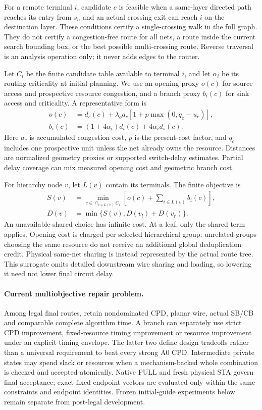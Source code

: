 \documentclass[conference,10pt]{IEEEtran}
\begin{document}
For a remote terminal $i$, candidate $c$ is feasible when a same-layer directed path reaches its entry from $s_n$ and an actual crossing exit can reach $i$ on the destination layer. These conditions certify a single-crossing walk in the full graph. They do not certify a congestion-free route for all nets, a route inside the current search bounding box, or the best possible multi-crossing route. Reverse traversal is an analysis operation only; it never adds edges to the router.

Let $C_i$ be the finite candidate table available to terminal $i$, and let $\alpha_i$ be its routing criticality at initial planning. We use an opening proxy $o(c)$ for source access and prospective resource congestion, and a branch proxy $b_i(c)$ for sink access and criticality. A representative form is
\begin{align}
 o(c)&=d_s(c)+\lambda_o a_c[1+p\max(0,q_c-u_c)],\\
 b_i(c)&=(1+4\alpha_i)d_i(c)+4\alpha_i d_s(c).
\end{align}
Here $a_c$ is accumulated congestion cost, $p$ is the present-cost factor, and $q_c$ includes one prospective unit unless the net already owns the resource. Distances are normalized geometry proxies or supported switch-delay estimates. Partial delay coverage can mix measured opening cost and geometric branch cost.

For hierarchy node $v$, let $L(v)$ contain its terminals. The finite objective is
\begin{equation}
 \begin{aligned}
 S(v)&=\min_{c\in\cap_{i\in L(v)}C_i}\left[o(c)+\sum_{i\in L(v)}b_i(c)\right],\\
 D(v)&=\min\{S(v),D(v_l)+D(v_r)\}.
\end{aligned}
\end{equation}
An unavailable shared choice has infinite cost. At a leaf, only the shared term applies. Opening cost is charged per selected hierarchical group; unrelated groups choosing the same resource do not receive an additional global deduplication credit. Physical same-net sharing is instead represented by the actual route tree. This surrogate omits detailed downstream wire sharing and loading, so lowering it need not lower final circuit delay.

\paragraph{Current multiobjective repair problem.}
Among legal final routes, retain nondominated CPD, planar wire, actual SB/CB and comparable complete algorithm time. A branch can separately use strict CPD improvement, fixed-resource timing improvement or resource improvement under an explicit timing envelope. The latter two define design tradeoffs rather than a universal requirement to beat every strong A0 CPD. Intermediate private states may spend slack or resources when a mechanism-backed whole combination is checked and accepted atomically. Native FULL and fresh physical STA govern final acceptance; exact fixed endpoint vectors are evaluated only within the same constraints and endpoint identities. Frozen initial-guide experiments below remain separate from post-legal development.
\end{document}
